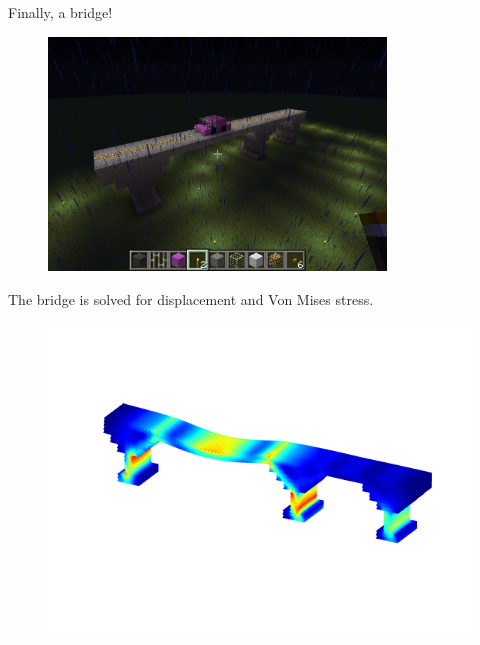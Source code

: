 \documentclass[screen]{beamer}
\begin{document}
\begin{frame}
Finally, a bridge!
\begin{figure}
  		\includegraphics[width=0.8\textwidth]{figures/pic_bridge}
\end{figure}
\end{frame}

\begin{frame}
The bridge is solved for displacement and Von Mises stress.
\begin{figure}
  		\includegraphics[width=\textwidth]{figures/onlyBridge}
\end{figure}
\end{frame}
\end{document}
